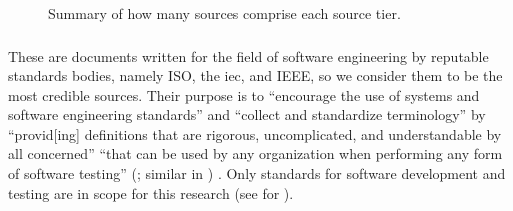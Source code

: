 \begin{figure}[b!]
    \centering
    \caption{Summary of how many sources comprise each source tier.}
    \label{fig:sourceSummary}
\end{figure}

\ifnotpaper\newpage\fi
\subsubsection{}\label{stds}

These are documents written for the field of software engineering by reputable
standards bodies, namely ISO, the \acf{iec}, and IEEE, so we consider them to
be the most credible sources. Their purpose is to
``encourage the use of systems and software engineering standards'' and
``collect and standardize terminology'' by ``provid[ing] definitions that are
rigorous, uncomplicated, and understandable by all concerned''
\citep[p.~viii]{IEEE2017} ``that can be used by any organization when
performing any form of software testing'' \ifnotpaper
    (\citeyear[p.~vii]{IEEE2022}; similar in \citeyear[p.~ix]{IEEE2016})\else
    \cite[p.~vii]{IEEE2022}\fi.
Only standards for software development and testing are in scope for
this research (see  for \highLvlScope).

\subsubsection{}\label{metas}

